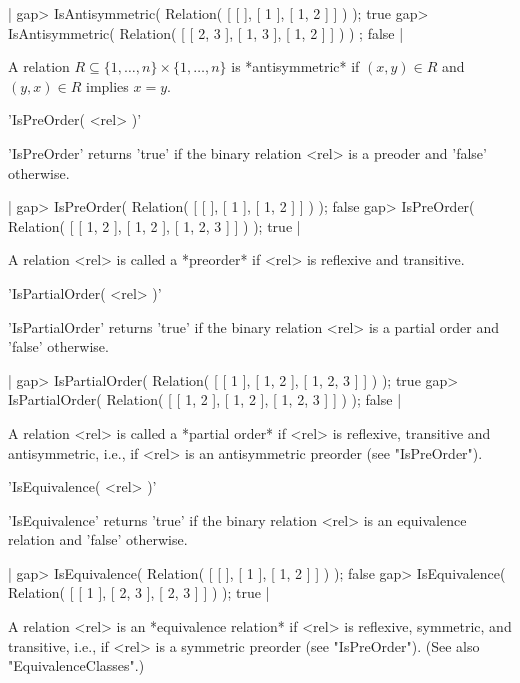 |    gap> IsAntisymmetric( Relation( [ [  ], [ 1 ], [ 1, 2 ] ] ) );
    true
    gap> IsAntisymmetric( Relation( [ [ 2, 3 ], [ 1, 3 ], [ 1, 2 ] ] ) ) ;
    false |

A  relation $R   \subseteq \{1, \dots,   n\}  \times \{1,  \dots, n\}$ is
*antisymmetric* if $(x, y) \in R$ and $(y, x) \in R$ implies $x = y$.

%

'IsPreOrder( <rel> )'

'IsPreOrder' returns 'true' if the binary relation <rel> is a preoder and
'false' otherwise.

|    gap> IsPreOrder( Relation( [ [  ], [ 1 ], [ 1, 2 ] ] ) );      
    false
    gap> IsPreOrder( Relation( [ [ 1, 2 ], [ 1, 2 ], [ 1, 2, 3 ] ] ) ); 
    true |
    
A relation    <rel> is called  a   *preorder* if <rel>   is reflexive and
transitive.

%

'IsPartialOrder( <rel> )'

'IsPartialOrder' returns 'true' if the binary relation <rel> is a partial
order and 'false' otherwise.

|    gap> IsPartialOrder( Relation( [ [ 1 ], [ 1, 2 ], [ 1, 2, 3 ] ] ) );
    true
    gap> IsPartialOrder( Relation( [ [ 1, 2 ], [ 1, 2 ], [ 1, 2, 3 ] ] ) );
    false |

A relation   <rel> is called  a  *partial order*  if  <rel> is reflexive,
transitive and antisymmetric, i.e., if <rel> is an antisymmetric preorder
(see "IsPreOrder").

%

'IsEquivalence( <rel> )'

'IsEquivalence' returns  'true' if   the  binary  relation <rel>   is  an
equivalence relation and 'false' otherwise.

|    gap> IsEquivalence( Relation( [ [ ], [ 1 ], [ 1, 2 ] ] ) );
    false
    gap> IsEquivalence( Relation( [ [ 1 ], [ 2, 3 ], [ 2, 3 ] ] ) );
    true |
    
A relation   <rel> is an *equivalence  relation*   if <rel> is reflexive,
symmetric,  and transitive, i.e.,  if <rel> is  a symmetric preorder (see
"IsPreOrder").  (See also "EquivalenceClasses".)

